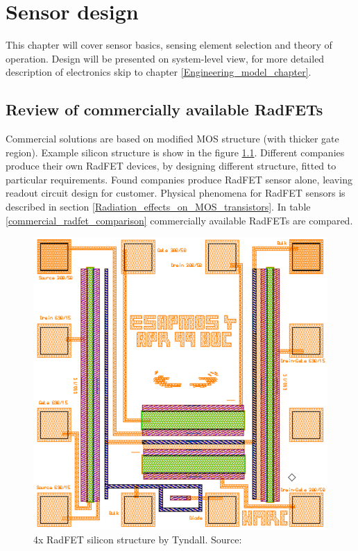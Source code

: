 \chapter{Sensor design}
This chapter will cover sensor basics, sensing element selection and theory of operation. Design will be presented on system-level view, for more detailed description of electronics skip to chapter \ref{Engineering_model_chapter}.

\section{Review of commercially available RadFETs}
    Commercial solutions are based on modified MOS structure (with thicker gate region). Example silicon structure is show in the figure \ref{Tyndall_radfet_silicon}. Different companies produce their own RadFET devices, by designing different structure, fitted to particular requirements. Found companies produce RadFET sensor alone, leaving readout circuit design for customer. Physical phenomena for RadFET sensors is described in section \ref{Radiation_effects_on_MOS_transistors}. In table \ref{commercial_radfet_comparison} commercially available RadFETs are compared.

    \begin{figure}[H]
        \centering
        \includegraphics[width=0.5\paperwidth]{img/05/radfet-silicon.eps}
        \caption{4x RadFET silicon structure by Tyndall. Source: \cite{Tyndall_Radfet}}
        \label{Tyndall_radfet_silicon}
    \end{figure}

